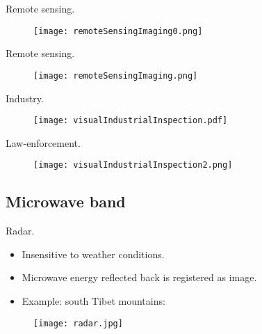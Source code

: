 
\begin{frame}
Remote sensing.
\begin{figure}
\texttt{[image: remoteSensingImaging0.png]}
\end{figure}
\end{frame}


\begin{frame}
Remote sensing.
\begin{figure}
\texttt{[image: remoteSensingImaging.png]}
\end{figure}
\end{frame}


\begin{frame}
Industry.
\begin{figure}
\texttt{[image: visualIndustrialInspection.pdf]}
\end{figure}
\end{frame}


\begin{frame}
Law-enforcement.
\begin{figure}
\texttt{[image: visualIndustrialInspection2.png]}
\end{figure}
\end{frame}


\subsection{Microwave band}


\begin{frame}
Radar.
\begin{itemize}
\item Insensitive to weather conditions.
\item Microwave energy reflected back is registered as image.
\item Example: south Tibet mountains:
\end{itemize}
\begin{figure}
\texttt{[image: radar.jpg]}
\end{figure}
\end{frame}

